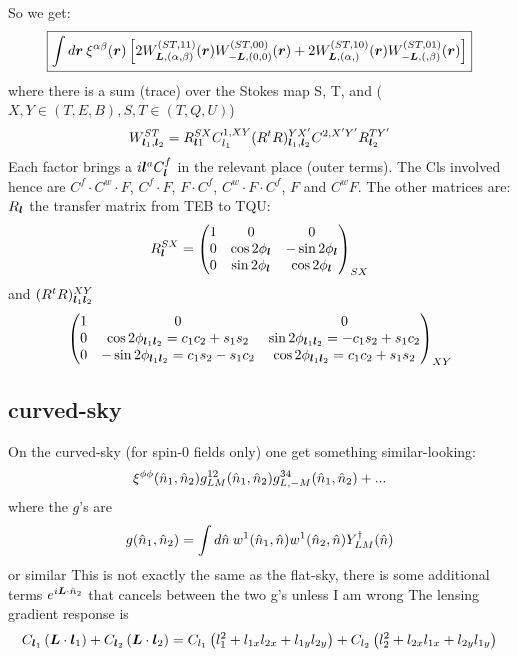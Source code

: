 \documentclass[11pt]{article}
\begin{document}
So we get:
\begin{equation}\boxed{
 \int d\boldsymbol{r} \:	\xi^{\alpha \beta}(\boldsymbol{r}) \left[2W^{(ST, 11)}_{\boldsymbol{L}, (\alpha, \beta)}(\boldsymbol{r})W^{(ST, 00)}_{-\boldsymbol{L},(0,0)}(\boldsymbol{r}) + 2 W^{(ST, 10)}_{\boldsymbol{L}, (\alpha,)}(\boldsymbol{r})W^{(ST, 01)}_{-\boldsymbol{L},(,\beta)}(\boldsymbol{r})\right]}
\end{equation}
where there is a sum (trace) over the Stokes map S, T, and ($X, Y \in (T, E ,B), S, T \in (T, Q, U)$)
\begin{equation}
	W^{ST}_{\boldsymbol{l}_1,\boldsymbol{l}_2} = R^{SX}_{\boldsymbol{l}1} C^{1, XY}_{l_1} (R^tR)^{YX'}_{\boldsymbol{l}_1,\boldsymbol{l}_2} C^{2, X' Y'} R^{T Y'}_{\boldsymbol{l}_2}
\end{equation}
Each factor brings a $i\boldsymbol{l}^a C^{f}_{\boldsymbol{l}}$ in the relevant place (outer terms). The Cls involved hence are $C^f \cdot C^w  \cdot F$, $C^f \cdot F$, $F \cdot C^f$, $ C^w \cdot F \cdot C^f$, $F$ and $C^w F$.
The other matrices are: $R_{\boldsymbol{l}}$ the transfer matrix from TEB to TQU:
\begin{equation} R^{SX}_{\boldsymbol{l}} = 
	\begin{pmatrix}
		1 & 0 & 0 \\ 0 & \cos 2\phi_{\boldsymbol{l}} & -\sin 2\phi_{\boldsymbol{l}} \\ 0 & \sin 2\phi_{\boldsymbol{l}} & \cos 2\phi_{\boldsymbol{l}}
	\end{pmatrix}_{SX}
\end{equation}
and $(R^tR)^{XY}_{\boldsymbol{l}_1\boldsymbol{l}_2}$
\begin{equation}
		\begin{pmatrix}
		1 & 0 & 0 \\ 0 & \cos 2\phi_{\boldsymbol{l}_1\boldsymbol{l}_2}= c_1c_2 + s_1 s_2 & \sin 2\phi_{\boldsymbol{l}_1\boldsymbol{l}_2}= -c_1s_2 + s_1 c_2 \\ 0 & -\sin 2\phi_{\boldsymbol{l}_1\boldsymbol{l}_2}= c_1s_2 - s_1 c_2 & \cos 2\phi_{\boldsymbol{l}_1\boldsymbol{l}_2}= c_1c_2 + s_1 s_2
	\end{pmatrix}_{XY}
\end{equation}

\subsection{curved-sky}
On the curved-sky (for spin-0 fields only) one get something similar-looking:
\begin{equation}
\xi^{\phi\phi}({\hat n}_1,{\hat n}_2) g^{12}_{LM}({\hat n}_1,{\hat n}_2) g^{34}_{L,-M}({\hat n}_1,{\hat n}_2) + ...
\end{equation}
where the $g$'s are
\begin{equation}
	g({\hat n}_1, {\hat n}_2) = \int d{\hat n} \:w^1({\hat n}_1, {\hat n})w^1({\hat n}_2, {\hat n}) Y^\dagger_{LM}({\hat n})
\end{equation}
or similar
\color{red} This is not exactly the same as the flat-sky, there is some additional terms $e^{i \boldsymbol{L} \cdot {\hat n}_2}$ that cancels between the two g's unless I am wrong
\color{black}
The lensing gradient response is
\begin{equation}
	C_{\boldsymbol{l}_1} \left( \boldsymbol{L} \cdot \boldsymbol{l}_1 \right) + C_{\boldsymbol{l}_2} \left( \boldsymbol{L} \cdot \boldsymbol{l}_2 \right) = C_{l_1}\left( l_1^2  + l_{1x} l_{2x} + l_{1y} l_{2y}\right) + C_{l_2}\left( l_2^2  + l_{2x} l_{1x} + l_{2y} l_{1y}\right)
\end{equation}
\end{document}
